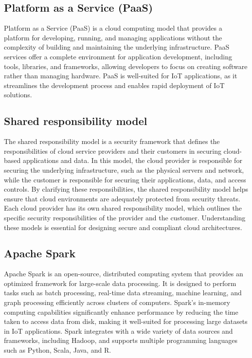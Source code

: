 \subsection*{Platform as a Service (PaaS)}
\label{sec:paas}
Platform as a Service (PaaS) is a cloud computing model that provides a platform for developing, running, and managing applications without the complexity of building and maintaining the underlying infrastructure. PaaS services offer a complete environment for application development, including tools, libraries, and frameworks, allowing developers to focus on creating software rather than managing hardware. PaaS is well-suited for IoT applications, as it streamlines the development process and enables rapid deployment of IoT solutions.

\subsection*{Shared responsibility model}
\label{sec:shared-responsibility-model}
The shared responsibility model is a security framework that defines the responsibilities of cloud service providers and their customers in securing cloud-based applications and data. In this model, the cloud provider is responsible for securing the underlying infrastructure, such as the physical servers and network, while the customer is responsible for securing their applications, data, and access controls. By clarifying these responsibilities, the shared responsibility model helps ensure that cloud environments are adequately protected from security threats.
Each cloud provider has its own shared responsibility model, which outlines the specific security responsibilities of the provider and the customer. Understanding these models is essential for designing secure and compliant cloud architectures.

\subsection*{Apache Spark}
\label{sec:apache-spark}
Apache Spark\cite{site:spark} is an open-source, distributed computing system that provides an optimized framework for large-scale data processing. It is designed to perform tasks such as batch processing, real-time data streaming, machine learning, and graph processing efficiently across clusters of computers. Spark's in-memory computing capabilities significantly enhance performance by reducing the time taken to access data from disk, making it well-suited for processing large datasets in IoT applications. Spark integrates with a wide variety of data sources and frameworks, including Hadoop, and supports multiple programming languages such as Python, Scala, Java, and R.

